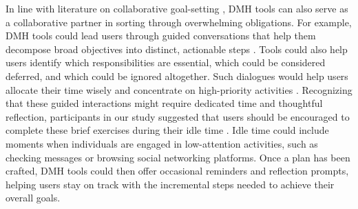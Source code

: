 In line with literature on collaborative goal-setting \cite{agapie2022longitudinal, lee2021sticky, zakaria2019stressmon, jung2023enjoy, xu2023technology}, DMH tools can also serve as a collaborative partner in sorting through overwhelming obligations. For example, DMH tools could lead users through guided conversations that help them decompose broad objectives into distinct, actionable steps \cite{o2018suddenly, bowman2022pervasive, borghouts2021barriers}. Tools could also help users identify which responsibilities are essential, which could be considered deferred, and which could be ignored altogether. Such dialogues would help users allocate their time wisely and concentrate on high-priority activities \cite{pereira2021struggling, grover2020design}.
Recognizing that these guided interactions might require dedicated time and thoughtful reflection, participants in our study suggested that users should be encouraged to complete these brief exercises during their idle time \cite{poole2013hci, bhattacharjee2022design}. Idle time could include moments when individuals are engaged in low-attention activities, such as checking messages or browsing social networking platforms. Once a plan has been crafted, DMH tools could then offer occasional reminders and reflection prompts, helping users stay on track with the incremental steps needed to achieve their overall goals. 





